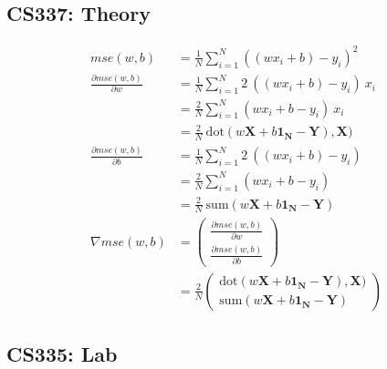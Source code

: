 \documentclass[12pt, fleqn]{article}
\newcommand{\twoxone}[2]{
    \begin{pmatrix}
        #1 \\
        #2
    \end{pmatrix}
}
\begin{document}
\subsection{CS337: Theory}
\begin{equation*}
  \begin{aligned}
    mse(w,b)                             & = \frac{1}{N} \sum_{i=1}^N ((w x_i + b) - y_i)^2                                                                                                    \\
    \frac{\partial mse(w,b)}{\partial w} & = \frac{1}{N} \sum_{i=1}^N 2 \ ((w x_i + b) - y_i) \ x_i                                                                                            \\
                                         & = \frac{2}{N} \sum_{i=1}^N (w x_i + b - y_i) \ x_i                                                                                                  \\
                                         & = \frac{2}{N} \ \text{dot}(w \mathbf{X} + b \mathbf{1_N} - \mathbf{Y}), \mathbf{X})                                                                 \\
    \frac{\partial mse(w,b)}{\partial b} & = \frac{1}{N} \sum_{i=1}^N 2 \ ((w x_i + b) - y_i)                                                                                                  \\
                                         & = \frac{2}{N} \sum_{i=1}^N (w x_i + b - y_i)                                                                                                        \\
                                         & = \frac{2}{N} \ \text{sum}(w \mathbf{X} + b \mathbf{1_N} - \mathbf{Y})                                                                              \\
    \nabla mse(w,b)                      & = \twoxone{\frac{\partial mse (w,b)}{\partial w}}{\frac{\partial mse (w,b)}{\partial b}}                                                            \\
                                         & = \frac{2}{N} \twoxone{\text{dot}(w \mathbf{X} + b \mathbf{1_N} - \mathbf{Y}), \mathbf{X})}{\text{sum}(w \mathbf{X} + b \mathbf{1_N} - \mathbf{Y})}
  \end{aligned}
\end{equation*}

\subsection{CS335: Lab}
\end{document}
